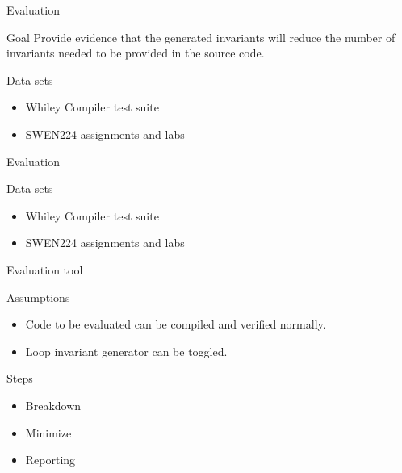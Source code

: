 \begin{frame}{Evaluation}

\begin{block}{Goal}
Provide evidence that the generated invariants will reduce the
number of invariants needed to be provided in the source code.
\end{block}

\begin{block}{Data sets}

\begin{itemize}
\item Whiley Compiler test suite
\item SWEN224 assignments and labs
\end{itemize}

\end{block}

\end{frame}

\begin{frame}{Evaluation}

\begin{block}{Data sets}

\begin{itemize}
\item Whiley Compiler test suite
\item SWEN224 assignments and labs
\end{itemize}

\end{block}

\end{frame}



\begin{frame}{Evaluation tool}

\begin{block}{Assumptions}

\begin{itemize}
\item Code to be evaluated can be compiled and verified normally.
\item Loop invariant generator can be toggled.
\end{itemize}

\end{block}


\begin{block}{Steps}
\begin{itemize}
\item Breakdown
\item Minimize
\item Reporting
\end{itemize}
\end{block}

\end{frame}



